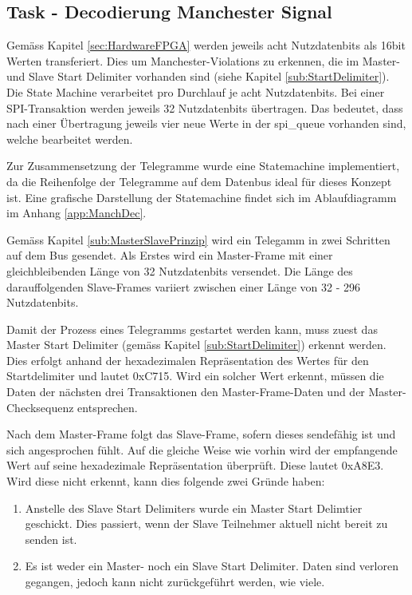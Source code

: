 \subsection{Task - Decodierung Manchester Signal}
\label{sub:MvbManchDecode}
Gemäss Kapitel \ref{sec:HardwareFPGA} werden jeweils acht Nutzdatenbits als 16bit Werten transferiert. Dies um Manchester-Violations zu erkennen, die im Master- und Slave Start Delimiter vorhanden sind (siehe Kapitel \ref{sub:StartDelimiter}). Die State Machine verarbeitet pro Durchlauf je acht Nutzdatenbits. Bei einer SPI-Transaktion werden jeweils 32 Nutzdatenbits übertragen. Das bedeutet, dass nach einer Übertragung jeweils vier neue Werte in der spi\_queue vorhanden sind, welche bearbeitet werden. 

Zur Zusammensetzung der Telegramme wurde eine Statemachine implementiert, da die Reihenfolge der Telegramme auf dem Datenbus ideal für dieses Konzept ist. Eine grafische Darstellung der Statemachine findet sich im Ablaufdiagramm im Anhang \ref{app:ManchDec}.

Gemäss Kapitel \ref{sub:MasterSlavePrinzip} wird ein Telegamm in zwei Schritten auf dem Bus gesendet. Als Erstes wird ein Master-Frame mit einer gleichbleibenden Länge von 32 Nutzdatenbits versendet. Die Länge des darauffolgenden Slave-Frames variiert zwischen einer Länge von 32 - 296 Nutzdatenbits.

Damit der Prozess eines Telegramms gestartet werden kann, muss zuest das Master Start Delimiter (gemäss Kapitel \ref{sub:StartDelimiter}) erkennt werden. Dies erfolgt anhand der hexadezimalen Repräsentation des Wertes für den Startdelimiter und lautet 0xC715. Wird ein solcher Wert erkennt, müssen die Daten der nächsten drei Transaktionen den Master-Frame-Daten und der Master-Checksequenz entsprechen.

Nach dem Master-Frame folgt das Slave-Frame, sofern dieses sendefähig ist und sich angesprochen fühlt. Auf die gleiche Weise wie vorhin wird der empfangende Wert auf seine hexadezimale Repräsentation überprüft. Diese lautet 0xA8E3. Wird diese nicht erkennt, kann dies folgende zwei Gründe haben:

\begin{enumerate}
    \item Anstelle des Slave Start Delimiters wurde ein Master Start Delimtier geschickt. Dies passiert, wenn der Slave Teilnehmer aktuell nicht bereit zu senden ist. 
    \item Es ist weder ein Master- noch ein Slave Start Delimiter. Daten sind verloren gegangen, jedoch kann nicht zurückgeführt werden, wie viele.
\end{enumerate}

